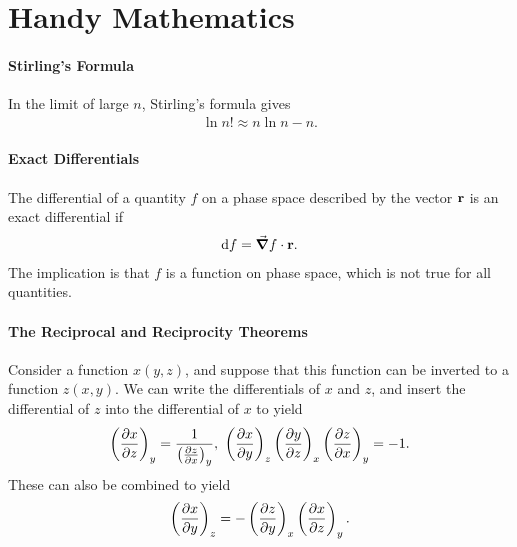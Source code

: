\section{Handy Mathematics}

\paragraph{Stirling's Formula}
In the limit of large $n$, Stirling's formula gives
\begin{align*}
	\ln{n!}\approx n\ln{n} - n.
\end{align*}

\paragraph{Exact Differentials}
The differential of a quantity $f$ on a phase space described by the vector $\vb{r}$ is an exact differential if
\begin{align*}
	\dd{f} = \grad{f}\cdot\vb{r}.
\end{align*}
The implication is that $f$ is a function on phase space, which is not true for all quantities.

\paragraph{The Reciprocal and Reciprocity Theorems}
Consider a function $x(y, z)$, and suppose that this function can be inverted to a function $z(x, y)$. We can write the differentials of $x$ and $z$, and insert the differential of $z$ into the differential of $x$ to yield
\begin{align*}
	\fix{\pdv{x}{z}}{y} = \frac{1}{\fix{\pdv{z}{x}}{y}},\ \fix{\pdv{x}{y}}{z}\fix{\pdv{y}{z}}{x}\fix{\pdv{z}{x}}{y} = -1.
\end{align*}
These can also be combined to yield
\begin{align*}
	\left(\pdv{x}{y}\right)_{z} = -\left(\pdv{z}{y}\right)_{x}\left(\pdv{x}{z}\right)_{y}.
\end{align*}